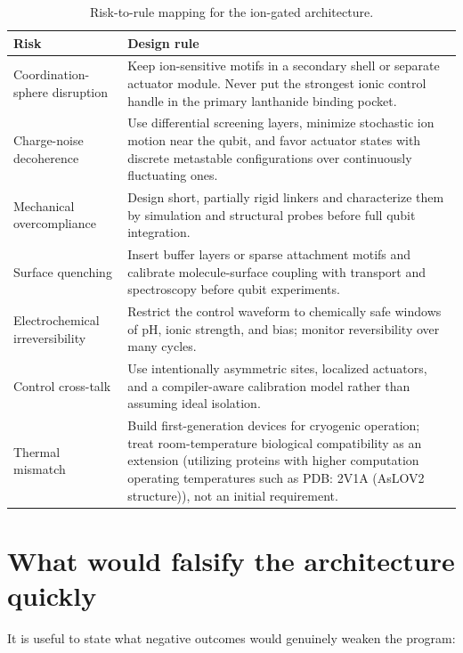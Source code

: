 \documentclass[11pt]{report}
\theoremstyle{definition}
\begin{document}
\begin{table}[ht]\label{mitigation}
\centering
\caption{Risk-to-rule mapping for the ion-gated architecture.}
\begin{tabularx}{\textwidth}{>{\raggedright\arraybackslash}p{4.0cm} X}
\toprule
Risk & Design rule \\
\midrule
Coordination-sphere disruption & Keep ion-sensitive motifs in a secondary shell or separate actuator module. Never put the strongest ionic control handle in the primary lanthanide binding pocket. \\
Charge-noise decoherence & Use differential screening layers, minimize stochastic ion motion near the qubit, and favor actuator states with discrete metastable configurations over continuously fluctuating ones. \\
Mechanical overcompliance & Design short, partially rigid linkers and characterize them by simulation and structural probes before full qubit integration. \\
Surface quenching & Insert buffer layers or sparse attachment motifs and calibrate molecule-surface coupling with transport and spectroscopy before qubit experiments. \\
Electrochemical irreversibility & Restrict the control waveform to chemically safe windows of pH, ionic strength, and bias; monitor reversibility over many cycles. \\
Control cross-talk & Use intentionally asymmetric sites, localized actuators, and a compiler-aware calibration model rather than assuming ideal isolation. \\
Thermal mismatch & Build first-generation devices for cryogenic operation; treat room-temperature biological compatibility as an extension (utilizing proteins with higher computation operating temperatures such as PDB: 2V1A (AsLOV2 structure)), not an initial requirement. \\
\bottomrule
\end{tabularx}
\end{table}

\section{What would falsify the architecture quickly}
It is useful to state what negative outcomes would genuinely weaken the program:
\end{document}

